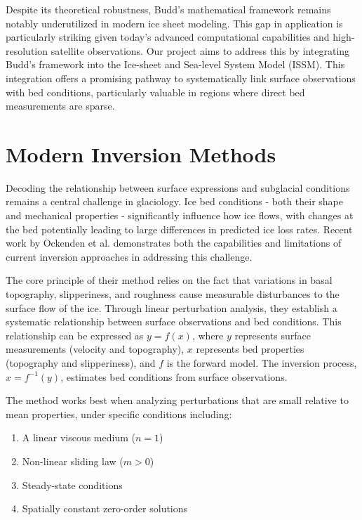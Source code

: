 Despite its theoretical robustness, Budd's mathematical framework remains notably underutilized in modern ice sheet modeling. This gap in application is particularly striking given today's advanced computational capabilities and high-resolution satellite observations. Our project aims to address this by integrating Budd's framework into the Ice-sheet and Sea-level System Model (ISSM). This integration offers a promising pathway to systematically link surface observations with bed conditions, particularly valuable in regions where direct bed measurements are sparse.

\section{Modern Inversion Methods}\label{Ockenden_2022}

Decoding the relationship between surface expressions and subglacial conditions remains a central challenge in glaciology. Ice bed conditions - both their shape and mechanical properties - significantly influence how ice flows, with changes at the bed potentially leading to large differences in predicted ice loss rates\cite{Ockenden_2022}. Recent work by Ockenden et al. demonstrates both the capabilities and limitations of current inversion approaches in addressing this challenge.

The core principle of their method relies on the fact that variations in basal topography, slipperiness, and roughness cause measurable disturbances to the surface flow of the ice. Through linear perturbation analysis, they establish a systematic relationship between surface observations and bed conditions. This relationship can be expressed as $y=f(x)$, where $y$ represents surface measurements (velocity and topography), $x$ represents bed properties (topography and slipperiness), and $f$ is the forward model\cite{Gudmundsson_2008}. The inversion process, $x=f^{-1}(y)$, estimates bed conditions from surface observations.

The method works best when analyzing perturbations that are small relative to mean properties, under specific conditions including:
\begin{enumerate}
    \item A linear viscous medium ($n=1$)
    \item Non-linear sliding law ($m>0$)
    \item Steady-state conditions
    \item Spatially constant zero-order solutions
\end{enumerate}


